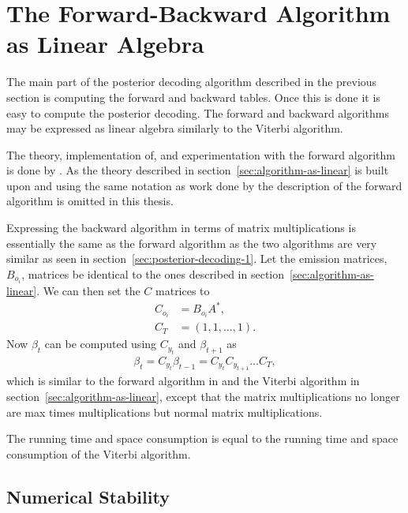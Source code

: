 \section{The Forward-Backward Algorithm as Linear Algebra}

The main part of the posterior decoding algorithm described in the previous
section is computing the forward and backward tables. Once this is done it is
easy to compute the posterior decoding. The forward and backward algorithms may
be expressed as linear algebra similarly to the Viterbi algorithm.

The theory, implementation of, and experimentation with the forward algorithm
is done by \citet{sand2013ziphmmlib}. As the theory described in
section~\ref{sec:algorithm-as-linear} is built upon and using the same notation
as work done by \citet{sand2013ziphmmlib} the description of the forward
algorithm is omitted in this thesis.

Expressing the backward algorithm in terms of matrix multiplications is
essentially the same as the forward algorithm as the two algorithms are very
similar as seen in section~\ref{sec:posterior-decoding-1}. Let the emission
matrices, $B_{o_i}$, matrices be identical to the ones described in
section~\ref{sec:algorithm-as-linear}. We can then set the $C$ matrices to
\begin{equation}
  \label{eq:4}
  \begin{aligned}
    C_{o_i} & = B_{o_i} A^*, \\
    C_T & = (1, 1, \dots, 1).
  \end{aligned}
\end{equation}
Now $\beta_t$ can be computed using $C_{y_t}$ and $\beta_{t + 1}$ as
\begin{equation}
  \label{eq:5}
  \begin{aligned}
    \beta_t = C_{y_t} \beta_{t - 1} = C_{y_t} C_{y_{t+1}}\dots C_T,
  \end{aligned}
\end{equation}
which is similar to the forward algorithm in \citet{sand2013ziphmmlib} and the
Viterbi algorithm in section~\ref{sec:algorithm-as-linear}, except that the
matrix multiplications no longer are max times multiplications but normal
matrix multiplications.

The running time and space consumption is equal to the running time and space
consumption of the Viterbi algorithm.

\subsection{Numerical Stability}

